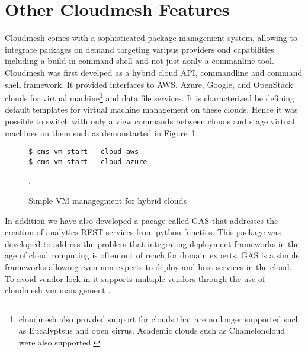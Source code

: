 
\section{Other Cloudmesh Features}

Cloudmesh comes with a sophisticated package management system, allowing to integrate packages on demand targeting varipus providers ond capabilities including a build in command shell and not just aonly a commanline tool.  Cloudmesh was first develped as a hybrid cloud API, commandline and command shell framework. It provided interfaces to AWS, Azure, Google, and OpenStack clouds for virtual machine\footnote{cloudmesh also provded support for clouds that are no longer supported such as Eucalyptsus and open cirrus. Academic clouds such as Chameloncloud were also supported.} and data file services. It is characterized be defining default templates for virtual machine management on these clouds. Hence it was possible to switch with only a view commands between clouds and stage virtual machines on them such as demonstarted in Figure~\ref{fig:cms}.

\begin{figure}[htb]

\begin{verbatim}
$ cms vm start --cloud aws
$ cms vm start --cloud azure
\end{verbatim}

  \caption{Simple VM managegment for hybrid clouds}
\label{fig:cms}.
\end{figure}  

In addition we have also developed a pacage called GAS that addresses the creation of analytics REST services from python functios. This package was developed to address the problem that integrating deployment frameworks in the age of cloud computing is often out of reach for domain experts.  GAS is a simple frameworks allowing even non-experts to deploy and host services in the cloud. To avoid vendor lock-in it supports multiple vendors through the use of cloudmesh vm management \cite{las21-gas}.
